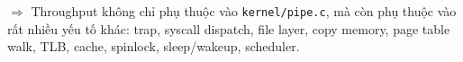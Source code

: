\documentclass[12pt,a4paper]{article}
\newcommand{\code}[1]{\texttt{#1}}
\begin{document}
$\Rightarrow$ Throughput không chỉ phụ thuộc vào \code{kernel/pipe.c}, mà còn phụ thuộc vào rất nhiều yếu tố khác: trap, syscall dispatch, file layer, copy memory, page table walk,
TLB, cache, spinlock, sleep/wakeup, scheduler.




\end{document}
